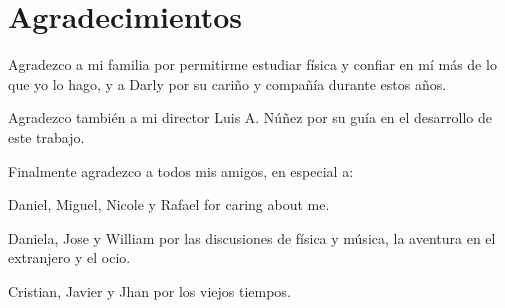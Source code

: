 

\chapter*{\hspace*{6.5cm}Agradecimientos}

\noindent Agradezco a mi familia por permitirme estudiar física y confiar en mí más de lo que yo lo hago, y a Darly por su cariño y compañía durante estos años.

\noindent Agradezco también a mi director Luis A. Núñez por su guía en el desarrollo de este trabajo.
  
\noindent Finalmente agradezco a todos mis amigos, en especial a:

\noindent Daniel, Miguel, Nicole y Rafael for caring about me.

\noindent Daniela, Jose y William por las discusiones de física y música, la aventura en el extranjero y el ocio.

\noindent Cristian, Javier y Jhan por los viejos tiempos.

\newpage